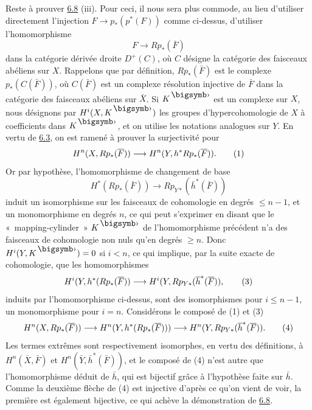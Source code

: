 \documentclass[10pt]{../fichiers-configuration-latex/smfart}
\begin{document}
Reste à prouver \hyperref[XII.prop6.8]{6.8} (iii). Pour ceci, il nous sera plus commode, au
lieu d'utiliser directement l'injection $F\rightarrow
p_{\ast}(p^{\ast}(F))$ comme ci-dessus, d'utiliser l'homomorphisme
$$
F\longrightarrow Rp_{\ast}(\bar{F})
$$
dans la catégorie dérivée droite $D^{+}(C)$, où $C$ désigne la
catégorie des faisceaux abéliens sur $X$. Rappelons que par
définition, $Rp_{\ast}(\bar{F})$ est le complexe
$p_{\ast}(C(\bar{F}))$, où $C(\bar{F})$ est un complexe résolution
injective de $\bar{F}$ dans la catégorie des faisceaux abéliens sur
$\bar{X}$. Si $K^{\bigdot}$ est un complexe sur $X$, nous désignons
par $H^{i}(X,K^{\bigdot})$ les groupes d'hypercohomologie de $X$ à
coefficients dans $K^{\bigdot}$, et on utilise les notations analogues
sur $Y$. En vertu de \hyperref[XII.cor6.3]{6.3}, on est ramené à prouver la surjectivité pour
\begin{equation*}
H^n(X,Rp_{\ast}(\overline{F}))\longrightarrow
H^n(Y,h^{\ast}Rp_{\ast}(\overline{F})){}.\tag{1}
\end{equation*}
Or par hypothèse, l'homomorphisme de changement de base
\begin{equation*}
H^{\ast}(Rp_{\ast}(\bar{F}))\longrightarrow Rp_{Y\ast}(\bar{h}^{\ast}(\bar{F}))\tag{2}
\end{equation*}
induit un isomorphisme sur les faisceaux de cohomologie en degrés
$\leq n-1$, et un monomorphisme en degrés $n$, ce qui peut s'exprimer
en disant que le « mapping-cylinder » \pageoriginale $K^{\bigdot}$
de l'homomorphisme précédent n'a des faisceaux de cohomologie non nuls
qu'en degrés $\geq n$. Donc $H^{i}(Y,K^{\bigdot})=0$ si $i<n$, ce qui
implique, par la suite exacte de cohomologie, que les homomorphismes
\begin{equation*}
H^{i}(Y,h^{\ast}(Rp_{\ast}(\overline{F}))\longrightarrow H^{i}(Y,Rp_{Y\ast}(\overline{h}^{\ast}(\overline{F})){},\tag{3}
\end{equation*}
induits par l'homomorphisme ci-dessus, sont des isomorphismes pour
$i\leq n-1$, un monomorphisme pour $i=n$. Considérons le composé de
(1) et (3)
\begin{equation*}
H^n(X,Rp_{\ast}(\overline{F}))\longrightarrow
H^n(Y,h^{\ast}(Rp_{\ast}(\overline{F})))\longrightarrow H^n(Y,Rp_{Y\ast}(\overline{h}^{\ast}(\overline{F})){}.\tag{4}
\end{equation*}
Les termes extrêmes sont respectivement isomorphes, en vertu des
définitions, à $H^n(\bar{X},\bar{F})$ et
$H^n(\bar{Y},\bar{h}^{\ast}(\bar{F}))$, et le composé de (4) n'est
autre que l'homomorphisme déduit de $\bar{h}$, qui est bijectif grâce
à l'hypothèse faite sur $\bar{h}$. Comme la deuxième flèche de (4) est
injective d'après ce qu'on vient de voir, la première est également
bijective, ce qui achève la démonstration de \hyperref[XII.prop6.8]{6.8}.
\end{document}
